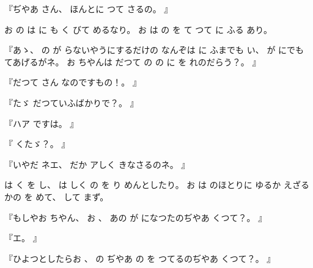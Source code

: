 
%
『ぢやあ
さん、
%
ほんとに
つて
さるの。
』

%
お
の
は
に
も
く
びて
めるなり。
%
お
は
の
を
て
つて
に
ふる
あり。

%
『あゝ、
%
の
が
らないやうにするだけの
なんぞは
に
ふまでも
い、
%
が
にでも
てあげるがネ。
%
お
ちやんは
だつて
の
の
に
を
れのだらう？。
』

%
『だつて
さん
なのですもの！。%
』

%
『たゞ
だつていふばかりで？。%
』

%
『ハア
ですは。
』

%
『
くたゞ？。
』

%
『いやだ
ネエ、
%
だか
アしく
きなさるのネ。
』

%
は
く
を
し、
%
は
しく
の
を
り
めんとしたり。
%
お
は
のほとりに
ゆるか
えざるかの
を
めて、
%
して
まず。

%
『もしやお
ちやん、
%
お
、
%
あの
が
になつたのぢやあ
くつて？。
』

%
『エ。
』

%
『ひよつとしたらお
、
%
の
ぢやあ
の
を
つてるのぢやあ
くつて？。
』

